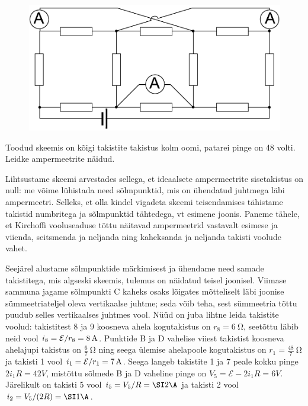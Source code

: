 \setAuthor{}

\begin{figure}
  \vspace{-15pt}
  \begin{center}
  \includegraphics[scale=0.65]{2019-v3g-07-yl.pdf}
  \end{center}
  \vspace{-20pt}
\end{figure}



Toodud skeemis on kõigi takistite takistus kolm oomi, patarei pinge on 48 volti. Leidke ampermeetrite näidud. 
\vspace{25pt}



\hint

\solu
Lihtsustame skeemi arvestades sellega, et ideaalsete ampermeetrite sisetakistus on null: me võime lühistada need sõlmpunktid, mis on ühendatud juhtmega läbi ampermeetri. Selleks, et olla kindel vigadeta skeemi teisendamises tähistame takistid numbritega ja sõlmpunktid tähtedega, vt esimene joonis. Paneme tähele, et Kirchoffi vooluseaduse tõttu näitavad ampermeetrid vastavalt esimese ja viienda, seitsmenda ja neljanda ning kaheksanda ja neljanda  takisti voolude vahet.

Seejärel alustame sõlmpunktide märkimisest ja ühendame need samade takistitega, mis algseski skeemis, tulemus on näidatud teisel joonisel. Viimase sammuna  jagame sõlmpunkti C kaheks osaks lõigates mõtteliselt läbi joonise sümmeetriateljel oleva vertikaalse juhtme; seda võib teha,  sest sümmeetria tõttu puudub selles vertikaalses juhtmes vool. Nüüd on juba lihtne leida takistite voolud: takistitest 8 ja 9 koosneva ahela kogutakistus on $r_8=\SI {6}\ohm$, seetõttu  läbib neid vool $i_8=\mathcal E/r_8=\SI 8A$. Punktide B ja D vahelise viiest takistist koosneva ahelajupi takistus on $\frac 67\SI {}\ohm$ ning seega ülemise ahelapoole kogutakistus on $r_1=\frac {48}7\SI {}\ohm$ ja takisti 1 vool $i_1=\mathcal E/r_1=\SI 7A$. Seega langeb takistite 1 ja 7 peale kokku pinge $2i_1R=\SI {42}V$, mistõttu sõlmede B ja D vaheline pinge on $V_5=\mathcal E-2i_1R=\SI {6}V$. Järelikult on takisti 5 vool $i_5=V_5/R=\SI 2\A$ ja takisti 2 vool $i_2=V_5/(2R)=\SI 1\A$. 

